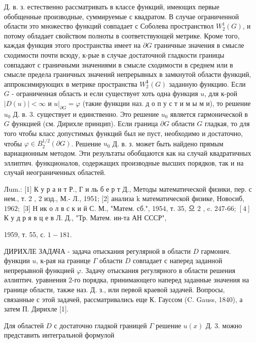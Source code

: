 \documentclass[10pt]{article}
\begin{document}
Д. в. з. естественно рассматривать в классе функций, имеющих первые обобщенные производные, суммируемые с квадратом. В случае ограниченной области это множество функций совпадает с Соболева пространствол $W_{2}^{1}(G)$, и потому обладает свойством полноты в соответствующей метрике. Кроме того, каждая функция этого пространства имеет на $\partial G$ граничные значения в смысле сходимости почти всюду, к-рые в случае достаточной гладкости границы совпадают с граничными значениями в смысле сходимости в среднем или в смысле предела граничных значений непрерывных в замкнутой области функций, аппроксимирующих в метрике пространства $W_{2}^{\mathbf{1}}(G)$ заданную функцию. Если $G$ - ограниченная область и если существуөт хоть одна функция $u$, для к-рой $|D(u)|<\infty$ и $\left.u\right|_{\partial G}=\varphi$ (такие функции наз. д о п у с т и м ы м и), то решение $u_{0}$ Д. в. 3. существует и единственно. Это решение $u_{0}$ является гармонической в $G$ функцией (см. Дирихле принцип). Если граница $\partial G$ области $G$ гладкая, то для того чтобы класс допустимых функций был не пуст, необходимо и достаточно, чтобы $\varphi \in B_{2}^{1 / 2}(\partial G)$. Решение $u_{0}$ Д. в. з. может быть найдено прямым вариационным методом. Эти результаты обобщаются как на случай квадратичных эллиптич. функционалов, содержащих производные высших порядков, так и на случай неограниченных областей.



Лum.: [1] К у р а н т Р., Г и ль б е р т Д., Методы математической физики, пер. с нем., т. 2 , 2 изд., М.- Л., 1951; [2] анализа $\mathrm{k}$ математической физике, Новосиб, $1962 ;$ [3] Н ик о л в с к и й С. М., "Матем. сб.", 1954, т. 35, 으 2 , c. 247-66; $[4]$ К у д р я в ц е в Л. Д., "Тр. Матем. ин-та АН СССР",

1959, т. 55, с. $1-181$.



ДИРИХЛЕ ЗАДАЧА - задача отыскания регулярной в области $D$ гармонич. функции $u$, к-рая на границе $\Gamma$ области $D$ совпадает с наперед заданной непрерывной функцией $\varphi$. Задачу отыскания регулярного в области решения әллиптич. уравнения 2-го порядка, принимающего наперед заданные значения на границе области, также наз. Д. з., или первой краевой задачей. Вопросы, связанные с этой задачей, рассматривались еще К. Гауссом (C. Gauss, 1840), а затем П. Дирихле [1].



Для областей $D$ с достаточно гладкой границей $\Gamma$ решение $u(x)$ Д. 3. можно представить интегральной формулой
\end{document}
